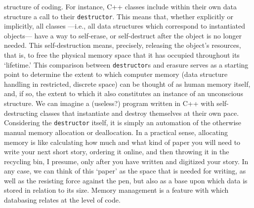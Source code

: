 structure of coding. For instance, C++ classes include within their own data structure a call to their \texttt{destructor}. This means that, whether explicitly or implicitly, all classes ---i.e., all data structures which correspond to instantiated objects--- have a way to self-erase, or self-destruct after the object is no longer needed. This self-destruction means, precisely, releasing the object's resources, that is, to free the physical memory space that it has occupied throughout its `lifetime.' This comparison between \texttt{destructor}s and erasure serves as a starting point to determine the extent to which computer memory (data structure handling in restricted, discrete space) can be thought of as human memory itself, and, if so, the extent to which it also constitutes an instance of an unconscious structure. We can imagine a (useless?) program written in C++ with self-destructing classes that instantiate and destroy themselves at their own pace. Considering the \texttt{destructor} itself, it is simply an automation of the otherwise manual memory allocation or deallocation. In a practical sense, allocating memory is like calculating how much and what kind of paper you will need to write your next short story, ordering it online, and then throwing it in the recycling bin, I presume, only after you have written and digitized your story. In any case, we can think of this `paper' as the space that is needed for writing, as well as the resisting force against the pen, but also as a base upon which data is stored in relation to its size. Memory management is a feature with which databasing relates at the level of code.



